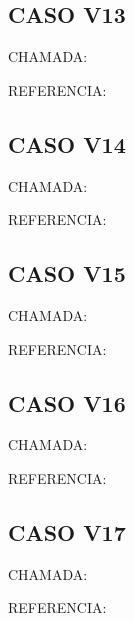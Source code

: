 \documentclass{undftex}
\begin{document}
\begin{refsection}\section*{CASO V13}\noindent CHAMADA:  \par\noindent REFERENCIA:\par\printbibliography[heading=none,check=undfconsultadas]\end{refsection}\clearpage
\begin{refsection}\section*{CASO V14}\noindent CHAMADA:  \par\noindent REFERENCIA:\par\printbibliography[heading=none,check=undfconsultadas]\end{refsection}\clearpage
\begin{refsection}\section*{CASO V15}\noindent CHAMADA:  \par\noindent REFERENCIA:\par\printbibliography[heading=none,check=undfconsultadas]\end{refsection}\clearpage
\begin{refsection}\section*{CASO V16}\noindent CHAMADA:  \par\noindent REFERENCIA:\par\printbibliography[heading=none,check=undfconsultadas]\end{refsection}\clearpage
\begin{refsection}\section*{CASO V17}\noindent CHAMADA:  \par\noindent REFERENCIA:\par\printbibliography[heading=none,check=undfconsultadas]\end{refsection}\clearpage
\end{document}

